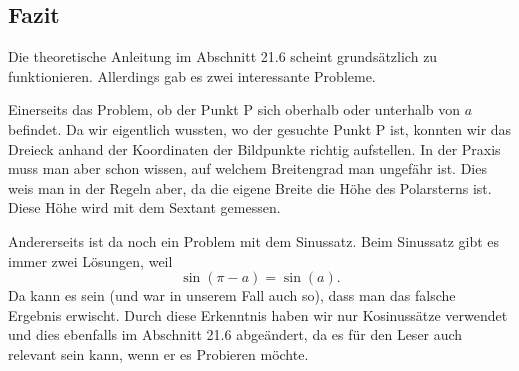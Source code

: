 \subsection{Fazit}
Die theoretische Anleitung im Abschnitt 21.6 scheint grundsätzlich zu funktionieren. 
Allerdings gab es zwei interessante Probleme.

Einerseits das Problem, ob der Punkt P sich oberhalb oder unterhalb von $a$ befindet. 
Da wir eigentlich wussten, wo der gesuchte Punkt P ist, konnten wir das Dreieck anhand der Koordinaten der Bildpunkte richtig aufstellen. 
In der Praxis muss man aber schon wissen, auf welchem Breitengrad man ungefähr ist. 
Dies weis man in der Regeln aber, da die eigene Breite die Höhe des Polarsterns ist.
Diese Höhe wird mit dem Sextant gemessen.

Andererseits ist da noch ein Problem mit dem Sinussatz.
Beim Sinussatz gibt es immer zwei Lösungen, weil \[ \sin(\pi-a)=\sin(a).\]
Da kann es sein (und war in unserem Fall auch so), dass man das falsche Ergebnis erwischt. 
Durch diese Erkenntnis haben wir nur Kosinussätze verwendet und dies ebenfalls im Abschnitt 21.6 abgeändert, da es für den Leser auch relevant sein kann, wenn er es Probieren möchte.




